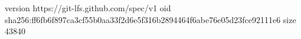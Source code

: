 version https://git-lfs.github.com/spec/v1
oid sha256:ff6fb6f897ca3cf55b0aa33f2d6e5f316b2894464f6abe76e05d23fce92111e6
size 43840
